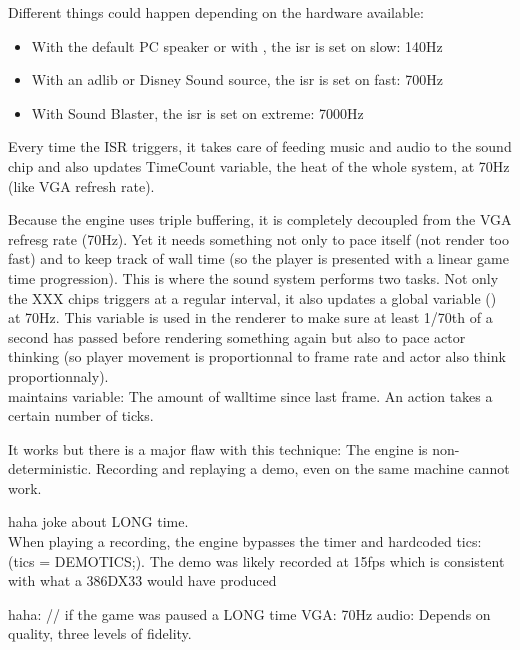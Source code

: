 Different things could happen depending on the hardware available:
\begin{itemize}
\item With the default PC speaker or with , the isr is set on slow: 140Hz
\item With an adlib or Disney Sound source, the isr is set on fast: 700Hz
\item With Sound Blaster, the isr is set on extreme: 7000Hz
\end{itemize}
Every time the ISR triggers, it takes care of feeding music and audio to the sound chip and also updates TimeCount variable, the heat of the whole system, at 70Hz (like VGA refresh rate).\\
\par
Because the engine uses triple buffering, it is completely decoupled from the VGA refresg rate (70Hz). Yet it needs something not only to pace itself (not render too fast) and to keep track of wall time (so the player is presented with a linear game time progression). This is where the sound system performs two tasks. Not only the XXX chips triggers at a regular interval, it also updates a global variable () at 70Hz. This variable is used in the renderer to make sure at least 1/70th of a second has passed before rendering something again but also to pace actor thinking (so player movement is proportionnal to frame rate and actor also think proportionnaly).\\
 maintains  variable: The amount of walltime since last frame. An action takes a certain number of ticks.\\
\par
It works but there is a major flaw with this technique: The engine is non-deterministic. Recording and replaying a demo, even on the same machine cannot work.\\\par
haha joke about LONG time.\\
 When playing a recording, the engine bypasses the timer and hardcoded tics: (tics = DEMOTICS;). The demo was likely recorded at 15fps which is consistent with what a 386DX33 would have produced

haha: // if the game was paused a LONG time
VGA: 70Hz
audio: Depends on quality, three levels of fidelity.

